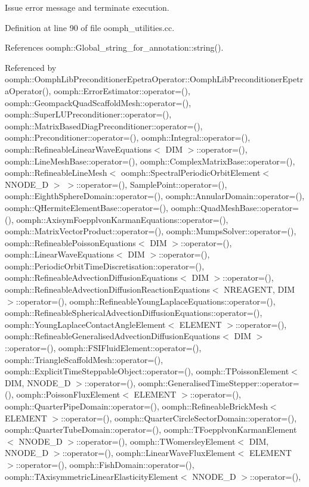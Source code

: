 Issue error message and terminate execution. 



Definition at line 90 of file oomph\+\_\+utilities.\+cc.



References oomph\+::\+Global\+\_\+string\+\_\+for\+\_\+annotation\+::string().



Referenced by oomph\+::\+Oomph\+Lib\+Preconditioner\+Epetra\+Operator\+::\+Oomph\+Lib\+Preconditioner\+Epetra\+Operator(), oomph\+::\+Error\+Estimator\+::operator=(), oomph\+::\+Geompack\+Quad\+Scaffold\+Mesh\+::operator=(), oomph\+::\+Super\+L\+U\+Preconditioner\+::operator=(), oomph\+::\+Matrix\+Based\+Diag\+Preconditioner\+::operator=(), oomph\+::\+Preconditioner\+::operator=(), oomph\+::\+Integral\+::operator=(), oomph\+::\+Refineable\+Linear\+Wave\+Equations$<$ D\+I\+M $>$\+::operator=(), oomph\+::\+Line\+Mesh\+Base\+::operator=(), oomph\+::\+Complex\+Matrix\+Base\+::operator=(), oomph\+::\+Refineable\+Line\+Mesh$<$ oomph\+::\+Spectral\+Periodic\+Orbit\+Element$<$ N\+N\+O\+D\+E\+\_\+D $>$ $>$\+::operator=(), Sample\+Point\+::operator=(), oomph\+::\+Eighth\+Sphere\+Domain\+::operator=(), oomph\+::\+Annular\+Domain\+::operator=(), oomph\+::\+Q\+Hermite\+Element\+Base\+::operator=(), oomph\+::\+Quad\+Mesh\+Base\+::operator=(), oomph\+::\+Axisym\+Foepplvon\+Karman\+Equations\+::operator=(), oomph\+::\+Matrix\+Vector\+Product\+::operator=(), oomph\+::\+Mumps\+Solver\+::operator=(), oomph\+::\+Refineable\+Poisson\+Equations$<$ D\+I\+M $>$\+::operator=(), oomph\+::\+Linear\+Wave\+Equations$<$ D\+I\+M $>$\+::operator=(), oomph\+::\+Periodic\+Orbit\+Time\+Discretisation\+::operator=(), oomph\+::\+Refineable\+Advection\+Diffusion\+Equations$<$ D\+I\+M $>$\+::operator=(), oomph\+::\+Refineable\+Advection\+Diffusion\+Reaction\+Equations$<$ N\+R\+E\+A\+G\+E\+N\+T, D\+I\+M $>$\+::operator=(), oomph\+::\+Refineable\+Young\+Laplace\+Equations\+::operator=(), oomph\+::\+Refineable\+Spherical\+Advection\+Diffusion\+Equations\+::operator=(), oomph\+::\+Young\+Laplace\+Contact\+Angle\+Element$<$ E\+L\+E\+M\+E\+N\+T $>$\+::operator=(), oomph\+::\+Refineable\+Generalised\+Advection\+Diffusion\+Equations$<$ D\+I\+M $>$\+::operator=(), oomph\+::\+F\+S\+I\+Fluid\+Element\+::operator=(), oomph\+::\+Triangle\+Scaffold\+Mesh\+::operator=(), oomph\+::\+Explicit\+Time\+Steppable\+Object\+::operator=(), oomph\+::\+T\+Poisson\+Element$<$ D\+I\+M, N\+N\+O\+D\+E\+\_\+D $>$\+::operator=(), oomph\+::\+Generalised\+Time\+Stepper\+::operator=(), oomph\+::\+Poisson\+Flux\+Element$<$ E\+L\+E\+M\+E\+N\+T $>$\+::operator=(), oomph\+::\+Quarter\+Pipe\+Domain\+::operator=(), oomph\+::\+Refineable\+Brick\+Mesh$<$ E\+L\+E\+M\+E\+N\+T $>$\+::operator=(), oomph\+::\+Quarter\+Circle\+Sector\+Domain\+::operator=(), oomph\+::\+Quarter\+Tube\+Domain\+::operator=(), oomph\+::\+T\+Foepplvon\+Karman\+Element$<$ N\+N\+O\+D\+E\+\_\+D $>$\+::operator=(), oomph\+::\+T\+Womersley\+Element$<$ D\+I\+M, N\+N\+O\+D\+E\+\_\+D $>$\+::operator=(), oomph\+::\+Linear\+Wave\+Flux\+Element$<$ E\+L\+E\+M\+E\+N\+T $>$\+::operator=(), oomph\+::\+Fish\+Domain\+::operator=(), oomph\+::\+T\+Axisymmetric\+Linear\+Elasticity\+Element$<$ N\+N\+O\+D\+E\+\_\+D $>$\+::operator=(), 